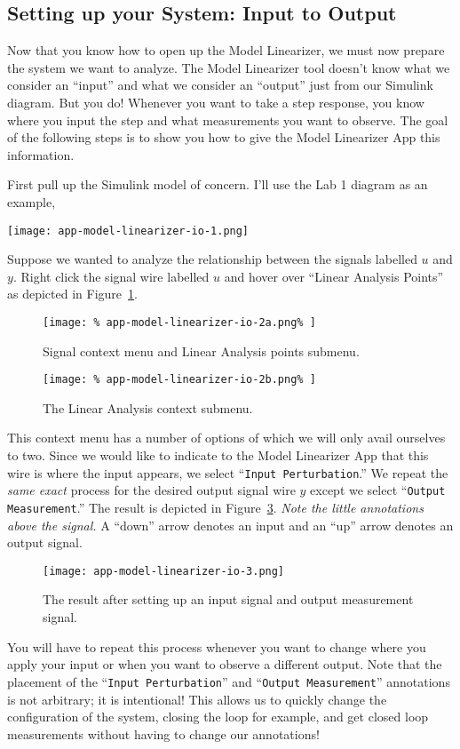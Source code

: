 \subsection{Setting up your System: Input to Output}
\label{App:Simulink:ModelLinearizer:2}
Now that you know how to open up the Model Linearizer, we must now prepare
the system we want to analyze. The Model Linearizer tool doesn't know what
we consider an ``input'' and what we consider an ``output'' just from our
Simulink diagram. But you do! Whenever you want to take a step response, you
know where you input the step and what measurements you want to observe.
The goal of the following steps is to show you how to give the Model
Linearizer App this information.

First pull up the Simulink model of concern. I'll use the Lab 1 diagram as
an example,
%
\begin{center}
  \texttt{[image: app-model-linearizer-io-1.png]}
\end{center}
%
Suppose we wanted to analyze the relationship between the signals
labelled \(u\) and \(y.\)
Right click the signal wire labelled \(u\) and hover over ``Linear Analysis
Points'' as depicted in Figure~\ref{fig:app1:io-menu:a}.
%
\begin{figure}
  \centering
  \texttt{[image: \%
    app-model-linearizer-io-2a.png\%
  ]}
  \caption{Signal context menu and Linear Analysis points submenu.}
  \label{fig:app1:io-menu:a}
\end{figure}
%
\begin{figure}
  \centering
  \texttt{[image: \%
    app-model-linearizer-io-2b.png\%
  ]}
  \caption{The Linear Analysis context submenu.}
  \label{fig:app1:io-menu:b}
\end{figure}
%
This context menu has a number of options of which we will only avail ourselves
to two.
Since we would like to indicate to the Model Linearizer App that this wire
is where the input appears, we select ``\texttt{Input Perturbation}.'' We
repeat the \emph{same exact} process for the desired output signal wire \(y\)
except we select ``\texttt{Output Measurement}.'' The result is
depicted in Figure~\ref{fig:app1:io-signals}. \emph{Note the little annotations
above the signal.}
A ``down'' arrow denotes an input and an ``up'' arrow denotes an output signal.
%
\begin{figure}
  \centering
  \texttt{[image: app-model-linearizer-io-3.png]}
  \caption{%
    The result after setting up an input signal and output
    measurement signal.%
  }
  \label{fig:app1:io-signals}
\end{figure}
%
You will have to repeat this process whenever you want to change where you
apply your input or when you want to observe a different output. Note that
the placement of the ``\texttt{Input Perturbation}'' and
``\texttt{Output Measurement}'' annotations is not arbitrary;
it is intentional! This
allows us to quickly change the configuration of the system, closing the loop
for example, and get closed loop measurements without having to change our
annotations!

